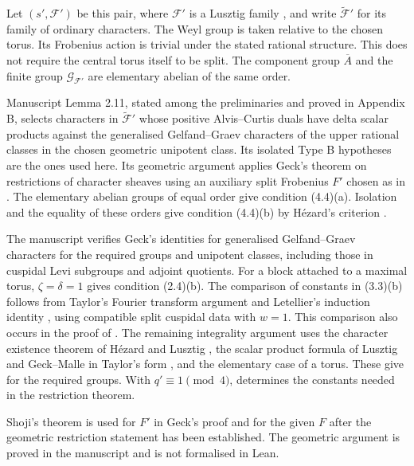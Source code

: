 Let $(s',\mathcal F')$ be this pair, where $\mathcal F'$ is a
Lusztig family \cite[Definition~4.1.17]{GeckMalle2020}, and write
$\widetilde{\mathcal F}'$ for its family of ordinary characters.
The Weyl group is taken relative to the chosen torus. Its Frobenius
action is trivial under the stated rational structure. This does not
require the central torus itself to be split. The component group
$\overline A$ and the finite group $\mathcal G_{\mathcal F'}$ are
elementary abelian of the same order.

Manuscript Lemma 2.11, stated among the preliminaries and proved in
Appendix B, selects characters in $\widetilde{\mathcal F}'$ whose
positive Alvis--Curtis duals have delta scalar products against the generalised Gelfand--Graev characters
of the upper rational classes in the chosen geometric unipotent class.
Its isolated Type B hypotheses are the ones used here.
Its geometric argument applies Geck's theorem on restrictions of
character sheaves \cite[Theorem~4.5]{Geck1999GGGR} using an auxiliary
split Frobenius $F'$ chosen as in \cite[(4.7)]{Geck1999GGGR}.
The elementary abelian groups of equal order give condition (4.4)(a).
Isolation and the equality of these orders give condition (4.4)(b)
by H\'ezard's criterion \cite[Proposition~2.3]{GeckHezard2008}.

The manuscript verifies Geck's identities for generalised Gelfand--Graev characters for the required
groups and unipotent classes, including those in cuspidal Levi
subgroups and adjoint quotients. For a block attached to a maximal
torus, $\zeta=\delta=1$ gives condition (2.4)(b). The comparison of
constants in (3.3)(b) follows from Taylor's Fourier transform argument
\cite[Lemma~11.3 and Proposition~11.5]{Taylor2016} and Letellier's
induction identity \cite[(6.2.11)]{Letellier2005},
using compatible split cuspidal data with $w=1$. This comparison
also occurs in the proof of \cite[Proposition~7.2]{Lusztig1992Support}.
The remaining integrality argument uses the character existence
theorem of H\'ezard and Lusztig \cite[Theorem~1.1]{Taylor2013},
the scalar product formula of Lusztig and Geck--Malle in Taylor's
form \cite[Proposition~15.4]{Taylor2016}, and the elementary case
of a torus. These give \cite[Proposition~3.1 and Corollary~3.2]{Geck1999GGGR}
for the required groups. With $q'\equiv1\pmod4$,
\cite[Theorem~3.8]{Geck1999GGGR} determines the constants needed
in the restriction theorem.

Shoji's theorem \cite[Theorem~3.2]{Shoji1995II} is used for $F'$
in Geck's proof and for the given $F$ after the geometric restriction
statement has been established. The geometric argument is proved in
the manuscript and is not formalised in Lean.

